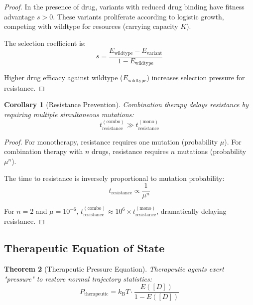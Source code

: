 \documentclass[11pt,twocolumn,a4paper]{article}
\newtheorem{theorem}{Theorem}[section]
\newtheorem{corollary}[theorem]{Corollary}
\theoremstyle{definition}
\theoremstyle{remark}
\newcommand{\kB}{k_{\mathrm{B}}}
\begin{document}
\begin{proof}
In the presence of drug, variants with reduced drug binding have fitness advantage $s > 0$. These variants proliferate according to logistic growth, competing with wildtype for resources (carrying capacity $K$).

The selection coefficient is:
\begin{equation}
s = \frac{E_{\mathrm{wildtype}} - E_{\mathrm{variant}}}{1 - E_{\mathrm{wildtype}}}
\label{eq:selection_coefficient}
\end{equation}

Higher drug efficacy against wildtype ($E_{\mathrm{wildtype}}$) increases selection pressure for resistance.
\end{proof}

\begin{corollary}[Resistance Prevention]
\label{cor:resistance_prevention}
Combination therapy delays resistance by requiring multiple simultaneous mutations:
\begin{equation}
t_{\mathrm{resistance}}^{\mathrm{(combo)}} \gg t_{\mathrm{resistance}}^{\mathrm{(mono)}}
\label{eq:resistance_delay}
\end{equation}
\end{corollary}

\begin{proof}
For monotherapy, resistance requires one mutation (probability $\mu$). For combination therapy with $n$ drugs, resistance requires $n$ mutations (probability $\mu^n$).

The time to resistance is inversely proportional to mutation probability:
\begin{equation}
t_{\mathrm{resistance}} \propto \frac{1}{\mu^n}
\end{equation}

For $n = 2$ and $\mu = 10^{-6}$, $t_{\mathrm{resistance}}^{\mathrm{(combo)}} \approx 10^6 \times t_{\mathrm{resistance}}^{\mathrm{(mono)}}$, dramatically delaying resistance.
\end{proof}

\subsection{Therapeutic Equation of State}

\begin{theorem}[Therapeutic Pressure Equation]
\label{thm:therapeutic_pressure}
Therapeutic agents exert "pressure" to restore normal trajectory statistics:
\begin{equation}
P_{\mathrm{therapeutic}} = \kB T \cdot \frac{E([D])}{1 - E([D])}
\label{eq:therapeutic_pressure}
\end{equation}
\end{theorem}
\end{document}
